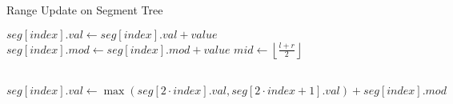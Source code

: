 \begin{algorithm}
    \caption{Range Update on Segment Tree}
    \begin{algorithmic}
                \State \Return
                \State $seg[index].val \gets seg[index].val + value$
                \State $seg[index].mod \gets seg[index].mod + value$
                \State \Return
            \Else
                \State $mid \gets \left\lfloor \frac{l + r}{2} \right\rfloor$
                \State {}
                \State {}
                \State {}
            \EndIf
        \EndProcedure

        \\

            \State $seg[index].val \gets \max(seg[2 \cdot index].val, seg[2 \cdot index + 1].val) + seg[index].mod$
        \EndProcedure
    \end{algorithmic}
\end{algorithm}